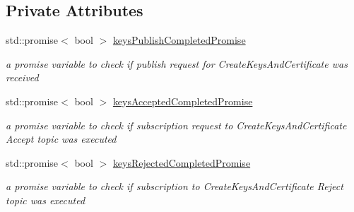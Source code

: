 \subsection*{Private Attributes}
\begin{DoxyCompactItemize}
\item 
\mbox{\label{class_aws_1_1_iot_1_1_device_client_1_1_fleet_provisioning_a71e0b3d04ea8e5bfcf4c1045eef3b4c1}} 
std\+::promise$<$ bool $>$ \hyperlink{class_aws_1_1_iot_1_1_device_client_1_1_fleet_provisioning_a71e0b3d04ea8e5bfcf4c1045eef3b4c1}{keys\+Publish\+Completed\+Promise}
\begin{DoxyCompactList}\small\item\em a promise variable to check if publish request for Create\+Keys\+And\+Certificate was received \end{DoxyCompactList}\item 
\mbox{\label{class_aws_1_1_iot_1_1_device_client_1_1_fleet_provisioning_a5c341917c25fdbf6c9401cbdd488e729}} 
std\+::promise$<$ bool $>$ \hyperlink{class_aws_1_1_iot_1_1_device_client_1_1_fleet_provisioning_a5c341917c25fdbf6c9401cbdd488e729}{keys\+Accepted\+Completed\+Promise}
\begin{DoxyCompactList}\small\item\em a promise variable to check if subscription request to Create\+Keys\+And\+Certificate Accept topic was executed \end{DoxyCompactList}\item 
\mbox{\label{class_aws_1_1_iot_1_1_device_client_1_1_fleet_provisioning_a6c49fdb1af059ea88bf99821757e6a96}} 
std\+::promise$<$ bool $>$ \hyperlink{class_aws_1_1_iot_1_1_device_client_1_1_fleet_provisioning_a6c49fdb1af059ea88bf99821757e6a96}{keys\+Rejected\+Completed\+Promise}
\begin{DoxyCompactList}\small\item\em a promise variable to check if subscription to Create\+Keys\+And\+Certificate Reject topic was executed \end{DoxyCompactList}\item 
\mbox{\label{class_aws_1_1_iot_1_1_device_client_1_1_fleet_provisioning_aafc3ae225f3d888c1439011db5393b95}} 

\end{DoxyCompactItemize}
